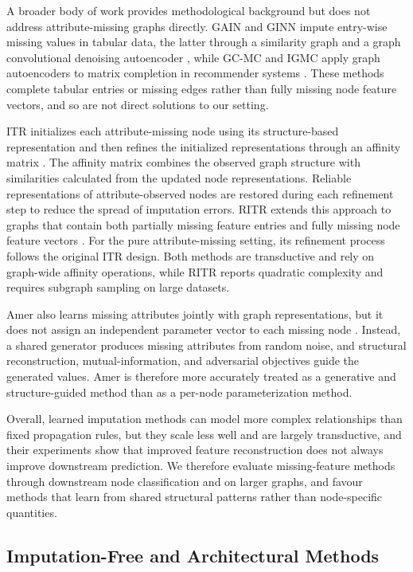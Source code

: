 A broader body of work provides methodological background but does not address attribute-missing graphs directly. GAIN and GINN impute entry-wise missing values in tabular data, the latter through a similarity graph and a graph convolutional denoising autoencoder \cite{yoon2018gain,spinelli2020missing}, while GC-MC and IGMC apply graph autoencoders to matrix completion in recommender systems \cite{berg2017graph,zhang2019inductive}. These methods complete tabular entries or missing edges rather than fully missing node feature vectors, and so are not direct solutions to our setting.

ITR initializes each attribute-missing node using its structure-based representation and then refines the initialized representations through an affinity matrix \cite{tu2022initializing}. The affinity matrix combines the observed graph structure with similarities calculated from the updated node representations. Reliable representations of attribute-observed nodes are restored during each refinement step to reduce the spread of imputation errors. RITR extends this approach to graphs that contain both partially missing feature entries and fully missing node feature vectors \cite{tu2024revisiting}. For the pure attribute-missing setting, its refinement process follows the original ITR design. Both methods are transductive and rely on graph-wide affinity operations, while RITR reports quadratic complexity and requires subgraph sampling on large datasets.

Amer also learns missing attributes jointly with graph representations, but it does not assign an independent parameter vector to each missing node \cite{jin2022amer}. Instead, a shared generator produces missing attributes from random noise, and structural reconstruction, mutual-information, and adversarial objectives guide the generated values. Amer is therefore more accurately treated as a generative and structure-guided method than as a per-node parameterization method.

Overall, learned imputation methods can model more complex relationships than fixed propagation rules, but they scale less well and are largely transductive, and their experiments show that improved feature reconstruction does not always improve downstream prediction. We therefore evaluate missing-feature methods through downstream node classification and on larger graphs, and favour methods that learn from shared structural patterns rather than node-specific quantities.

\subsection{Imputation-Free and Architectural Methods}

